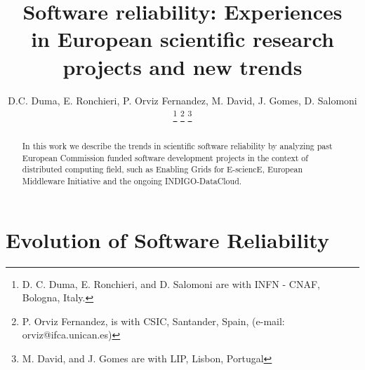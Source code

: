 \documentclass[journal]{IEEEtran}
\begin{document}
\title{Software reliability: Experiences\\
in European scientific research\\
projects and new trends}
%
%

\author{D.C. Duma, %
        E. Ronchieri, %
        P. Orviz Fernandez, %
        M. David, %
        J. Gomes, %
        D. Salomoni %
\thanks{D. C. Duma, E. Ronchieri, and D. Salomoni are with INFN - CNAF, Bologna, Italy.}%
\thanks{P. Orviz Fernandez, is with CSIC, Santander, Spain, (e-mail: orviz@ifca.unican.es)}%
\thanks{M. David, and J. Gomes are with LIP, Lisbon, Portugal}%
}

\maketitle
\pagestyle{empty}
\thispagestyle{empty}

\begin{abstract}
In this work we describe the trends in scientific software reliability by analyzing past European Commission funded software development projects in the context of distributed computing field, such as Enabling Grids for E-sciencE, European Middleware Initiative and the ongoing INDIGO-DataCloud.
\end{abstract}



\section{Evolution of Software Reliability}
%
%
%
%
\end{document}

